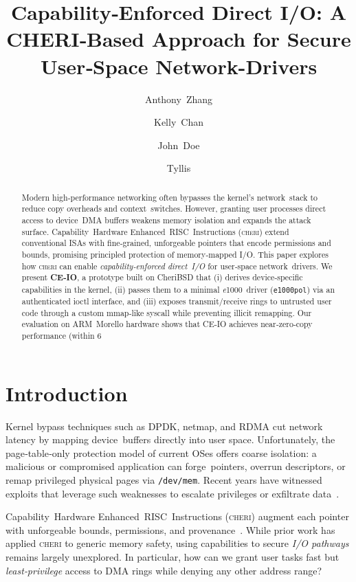 \documentclass[sigconf]{acmart}
\title{Capability‑Enforced Direct I/O: A CHERI‑Based Approach for Secure User‑Space Network-Drivers}
\author{Anthony Zhang}
\affiliation{\institution{Northwestern University}\country{USA}}
\author{Kelly Chan}
\affiliation{\institution{Northwestern University}\country{USA}}
\author{John Doe}
\affiliation{\institution{Northwestern University}\country{USA}}
\author{Tyllis}
\affiliation{\institution{Northwestern University}\country{USA}}
\newcommand{\cheri}{\textsc{cheri}\xspace}
\newcommand{\e}{\textit{e}1000\xspace}
\begin{document}
\begin{abstract}
Modern high‑performance networking often bypasses the kernel’s network stack to reduce copy overheads and context switches. However, granting user processes direct access to device DMA buffers weakens memory isolation and expands the attack surface. Capability Hardware Enhanced RISC Instructions (\cheri) extend conventional ISAs with fine‑grained, unforgeable pointers that encode permissions and bounds, promising principled protection of memory‑mapped I/O. This paper explores how \cheri can enable \emph{capability‑enforced direct I/O} for user‑space network drivers.
We present \textbf{CE‑IO}, a prototype built on CheriBSD that (i) derives device‑specific capabilities in the kernel, (ii) passes them to a minimal \e driver (\texttt{e1000pol}) via an authenticated ioctl interface, and (iii) exposes transmit/receive rings to untrusted user code through a custom mmap‑like syscall while preventing illicit remapping. Our evaluation on ARM Morello hardware shows that CE‑IO achieves near‑zero‑copy performance (within 6 %
\end{abstract}


\maketitle

\section{Introduction}
\label{sec:intro}
Kernel bypass techniques such as DPDK, netmap, and RDMA cut network latency by mapping device buffers directly into user space. Unfortunately, the page‑table‑only protection model of current OSes offers coarse isolation: a malicious or compromised application can forge pointers, overrun descriptors, or remap privileged physical pages via \texttt{/dev/mem}. Recent years have witnessed exploits that leverage such weaknesses to escalate privileges or exfiltrate data \cite{netmapCVE}.  

Capability Hardware Enhanced RISC Instructions (\cheri) augment each pointer with unforgeable bounds, permissions, and provenance \cite{woodruff2019cheri}. While prior work has applied \cheri to generic memory safety, using capabilities to secure \emph{I/O pathways} remains largely unexplored. In particular, how can we grant user tasks fast but \textit{least‑privilege} access to DMA rings while denying any other address range?  
\end{document}
